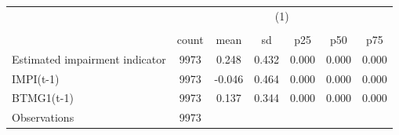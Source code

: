 {
\def\sym#1{\ifmmode^{#1}\else\(^{#1}\)\fi}
\begin{tabular}{l*{1}{cccccc}}
\hline\hline
                    &\multicolumn{6}{c}{(1)}                                                      \\
                    &\multicolumn{6}{c}{}                                                         \\
                    &       count&        mean&          sd&         p25&         p50&         p75\\
\hline
Estimated impairment indicator&        9973&       0.248&       0.432&       0.000&       0.000&       0.000\\
IMPI(t-1)           &        9973&      -0.046&       0.464&       0.000&       0.000&       0.000\\
BTMG1(t-1)          &        9973&       0.137&       0.344&       0.000&       0.000&       0.000\\
\hline
Observations        &        9973&            &            &            &            &            \\
\hline\hline
\end{tabular}
}
